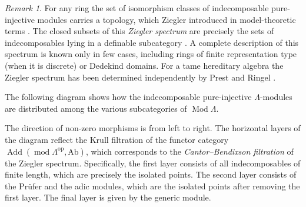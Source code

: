 \documentclass[a4paper]{amsart}
\theoremstyle{plain}
\theoremstyle{definition}
\theoremstyle{remark}
\newtheorem{rem}[thm]{Remark}
\numberwithin{equation}{section}
\newcommand{\Add}{\operatorname{Add}}
\renewcommand{\mod}{\operatorname{mod}}
\newcommand{\Mod}{\operatorname{Mod}}
\newcommand{\Ab}{\mathrm{Ab}}
\newcommand{\op}{\mathrm{op}}
\def\La{\Lambda}
\begin{document}
\begin{rem}
  For any ring the set of isomorphism classes of indecomposable
  pure-injective modules carries a topology, which Ziegler introduced
  in model-theoretic terms \cite{Zi1984}. The closed subsets of this
  \emph{Ziegler spectrum} are precisely the sets of indecomposables
  lying in a definable subcategory \cite{CB2}.  A complete description of this
  spectrum is known only in few cases, including rings of finite
  representation type (when it is discrete) or Dedekind domains. For a
  tame hereditary algebra the Ziegler spectrum has been determined
  independently by Prest \cite{Pr1998} and Ringel \cite{Ri1998}.
\end{rem}

The following diagram shows how the indecomposable pure-injective
$\La$-modules are distributed among the various subcategories of
$\Mod\La$. 
\medskip

\begin{center}
\end{center}
The direction of non-zero morphisms is from left to right. The
horizontal layers of the diagram reflect the Krull filtration of the
functor category $\Add(\mod \La^\op,\Ab)$, which corresponds to the
\emph{Cantor--Bendixson filtration} of the Ziegler
spectrum. Specifically, the first layer consists of all
indecomposables of finite length, which are precisely the isolated points.  The
second layer consists of the Pr\"ufer and the adic modules, which are
the isolated points after removing the first layer.  The final layer is given by
the generic module.
\end{document}
